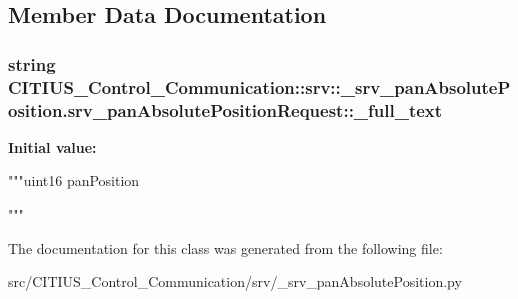 \subsection{\-Member \-Data \-Documentation}
\hypertarget{class_c_i_t_i_u_s___control___communication_1_1srv_1_1__srv__pan_absolute_position_1_1srv__pan_absolute_position_request_ab9a253349a9473709289fbb1f6e84d28}{
\subsubsection[{\-\_\-full\-\_\-text}]{\setlength{\rightskip}{0pt plus 5cm}string \-C\-I\-T\-I\-U\-S\-\_\-\-Control\-\_\-\-Communication\-::srv\-::\-\_\-srv\-\_\-pan\-Absolute\-Position.\-srv\-\_\-pan\-Absolute\-Position\-Request\-::\-\_\-full\-\_\-text}}\label{class_c_i_t_i_u_s___control___communication_1_1srv_1_1__srv__pan_absolute_position_1_1srv__pan_absolute_position_request_ab9a253349a9473709289fbb1f6e84d28}
{\bfseries \-Initial value\-:}
\begin{DoxyCode}
"""uint16 panPosition

"""
\end{DoxyCode}


\-The documentation for this class was generated from the following file\-:\begin{DoxyCompactItemize}
\item 
src/\-C\-I\-T\-I\-U\-S\-\_\-\-Control\-\_\-\-Communication/srv/\-\_\-srv\-\_\-pan\-Absolute\-Position.\-py\end{DoxyCompactItemize}
